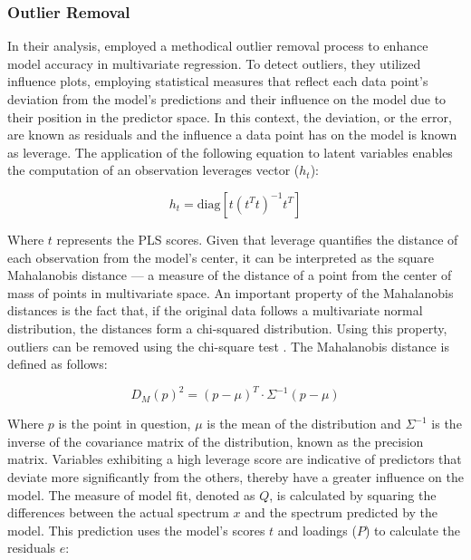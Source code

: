 \subsubsection{Outlier Removal}\label{sec:outlier_removal}

In their analysis, \citet{andersonImprovedAccuracyQuantitative2017} employed a methodical outlier removal process to enhance model accuracy in multivariate regression. To detect outliers, they utilized influence plots, employing statistical measures that reflect each data point's deviation from the model's predictions and their influence on the model due to their position in the predictor space. 
In this context, the deviation, or the error, are known as residuals and the influence a data point has on the model is known as leverage.
The application of the following equation to latent variables enables the computation of an observation leverages vector (\(h_t\)):

\begin{equation}
    h_t = \text{diag}\left[ t(t^T t)^{-1} t^T \right]
\end{equation}

Where $t$ represents the PLS scores.
Given that leverage quantifies the distance of each observation from the model's center, it can be interpreted as the square Mahalanobis distance — a measure of the distance of a point from the center of mass of points in multivariate space. 
An important property of the Mahalanobis distances is the fact that, if the original data follows a multivariate normal distribution, the distances form a chi-squared distribution. Using this property, outliers can be removed using the chi-square test \cite{brereton_chi_2015}.
The Mahalanobis distance is defined as follows:

\begin{equation}
    D_M(p)^2 = (p - \mu)^T \cdot \Sigma^{-1} (p - \mu)
\end{equation}

Where $p$ is the point in question, $\mu$ is the mean of the distribution and $\Sigma^{-1}$ is the inverse of the covariance matrix of the distribution, known as the precision matrix. 
Variables exhibiting a high leverage score are indicative of predictors that deviate more significantly from the others, thereby have a greater influence on the model.
The measure of model fit, denoted as $Q$, is calculated by squaring the differences between the actual spectrum $x$ and the spectrum predicted by the model. This prediction uses the model's scores $t$ and loadings ($P$) to calculate the residuals $e$:

